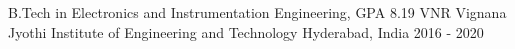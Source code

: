 

\begin{cventries}

  \cventry
    {B.Tech in Electronics and Instrumentation Engineering, GPA 8.19 } %
    {VNR Vignana Jyothi Institute of Engineering and Technology} %
    {Hyderabad, India} %
    {2016 - 2020} %
    {
    }
\vspace{-0.7cm}
\end{cventries}
